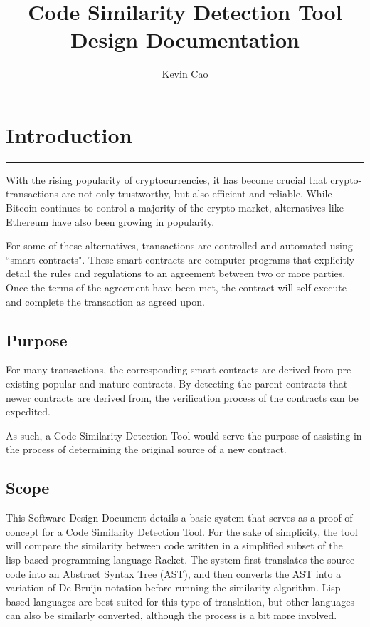 \documentclass[12pt]{article}
\title{Code Similarity Detection Tool\\
Design Documentation}
\author{Kevin Cao}
\newcommand{\usection}[1]{\section{#1}\hrule\hfill}
\begin{document}
\maketitle

\tableofcontents

\newpage

\usection{Introduction}

With the rising popularity of cryptocurrencies, it has become crucial that crypto-transactions are not only trustworthy, but also efficient and reliable. While Bitcoin continues to control a majority of the crypto-market, alternatives like Ethereum have also been growing in popularity.

\hfill

For some of these alternatives, transactions are controlled and automated using ``smart contracts". These smart contracts are computer programs that explicitly detail the rules and regulations to an agreement between two or more parties. Once the terms of the agreement have been met, the contract will self-execute and complete the transaction as agreed upon.

\subsection{Purpose}
For many transactions, the corresponding smart contracts are derived from pre-existing popular and mature contracts. By detecting the parent contracts that newer contracts are derived from, the verification process of the contracts can be expedited.

\hfill

As such, a Code Similarity Detection Tool would serve the purpose of assisting in the process of determining the original source of a new contract.

\subsection{Scope}

This Software Design Document details a basic system that serves as a proof of concept for a Code Similarity Detection Tool. For the sake of simplicity, the tool will compare the similarity between code written in a simplified subset of the lisp-based programming language Racket. The system first translates the source code into an Abstract Syntax Tree (AST), and then converts the AST into a variation of De Bruijn notation before running the similarity algorithm. Lisp-based languages are best suited for this type of translation, but other languages can also be similarly converted, although the process is a bit more involved.
\end{document}
